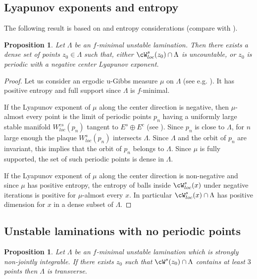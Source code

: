 \documentclass[a4paper,11pt]{amsart}
\numberwithin{equation}{section}     %
\newtheorem{prop}[teo]{Proposition}
\theoremstyle{definition}
\theoremstyle{remark}
\begin{document}
\subsection{Lyapunov exponents and entropy}\label{ss.prelimlyap}

The following result is based on \cite{ABC} and entropy considerations (compare with \cite[Proposition 7.4]{CPoS}). 

\begin{prop}\label{prop-lyapunovexponents}
Let $\Lambda$ be an $f$-minimal unstable lamination. Then there exists a dense set of points $z_0\in \Lambda$ such that, either $\cW^s_{loc}(z_0)\cap \Lambda$ is uncountable, or $z_0$ is periodic with a negative center Lyapunov exponent.
\end{prop}

\begin{proof}
Let us consider an ergodic u-Gibbs measure $\mu$ on $\Lambda$ (see e.g. \cite[\S{11}]{BDV}). It has positive entropy and full support since $\Lambda$ is $f$-minimal.

If the Lyapunov exponent of $\mu$ along the center direction is negative, then $\mu$-almost every point is the limit of periodic points $p_n$ having a uniformly large stable manifold $W^{cs}_{loc}(p_n)$ tangent to $E^s \oplus E^c$ (see \cite[\S 8]{ABC}). Since $p_n$ is close to $\Lambda$, for $n$ large enough the plaque $W^s_{loc}(p_n)$ intersects $\Lambda$. Since $\Lambda$ and the orbit of $p_n$ are invariant, this implies that the orbit of $p_n$ belongs to $\Lambda$. Since $\mu$ is fully supported, the set of such periodic points is dense in $\Lambda$.

If the Lyapunov exponent of $\mu$ along the center direction is non-negative and since $\mu$ has positive entropy,
the entropy of balls inside $\cW^s_{loc}(x)$ under negative iterations is positive for $\mu$-almost every $x$.
In particular $\cW^s_{loc}(x)\cap \Lambda$ has positive dimension for $x$ in a dense subset of $\Lambda$.
\end{proof}

\subsection{Unstable laminations with no periodic points}

\begin{prop}\label{p.transverse}
Let $\Lambda$ be an $f$-minimal unstable lamination which is strongly non-jointly integrable.
If there exists $z_0$ such that $\cW^s(z_0)\cap \Lambda$ contains at least $3$ points then $\Lambda$ is transverse.
\end{prop}
\end{document}
